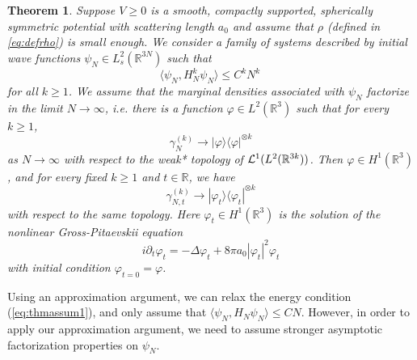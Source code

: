 \documentclass[11pt]{article}
\newtheorem{theorem}{Theorem}[section]
\newcommand{\ph}{\varphi}
\newcommand{\bR}{{\mathbb R}}
\newcommand{\cL}{{\cal L}}
\begin{document}
\begin{theorem}\label{thm:main1}
Suppose $V \geq 0$ is a smooth, compactly supported, spherically
symmetric potential with scattering length $a_0$ and assume that
$\rho$ (defined in \eqref{eq:defrho}) is small enough. We consider a
family of systems described by initial wave functions $\psi_N \in
L_s^2 (\bR^{3N})$ such that
\begin{equation}\label{eq:thmassum1}
\langle \psi_N, H^k_N \psi_N \rangle \leq C^k N^k \,
\end{equation}
for all $k \geq 1$. We assume that the marginal densities associated
with $\psi_N$ factorize in the limit $N \to \infty$, i.e. there is
 a function $\ph \in L^2 (\bR^3)$ such that for every
$k \geq 1$,
\begin{equation}\label{eq:thmassum2}
\gamma_N^{(k)} \to |\ph \rangle \langle \ph|^{\otimes k}
\end{equation}
as $N \to \infty$ with respect to the weak* topology of $\cL^1 (L^2
(\bR^{3k}))$. Then $\ph \in H^1 (\bR^3)$, and for every fixed $k
\geq 1$ and $t \in \bR$, we have
\begin{equation}\label{eq:conv1}
\gamma_{N,t}^{(k)} \to |\ph_t \rangle \langle \ph_t|^{\otimes k}
\end{equation}
with respect to the same topology. Here $\ph_t \in H^1 (\bR^3)$ is
the solution of the nonlinear Gross-Pitaevskii equation
\begin{equation}\label{eq:GP}
i\partial_t \ph_t = -\Delta \ph_t + 8\pi a_0 |\ph_t|^2 \ph_t
\end{equation}
with initial condition $\ph_{t=0} = \ph$.
\end{theorem}

Using an approximation argument, we can relax the energy condition
(\ref{eq:thmassum1}), and only assume that $\langle \psi_N, H_N
\psi_N \rangle \leq C N$. However, in order to apply our
approximation argument, we need to assume stronger asymptotic
factorization properties on $\psi_N$.
\end{document}

